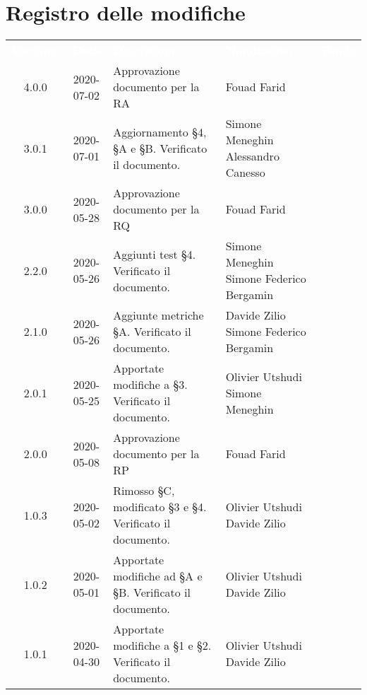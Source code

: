 \section*{Registro delle modifiche}
{
	\centering
	\begin{longtable}{ c c  C{4cm}  C{3.5cm}  C{3.5cm} }
		\textcolor{white}{\textbf{Versione}} & \textcolor{white}{\textbf{Data}} & \textcolor{white}{\textbf{Descrizione}} & \textcolor{white}{\textbf{Nominativo}} & \textcolor{white}{\textbf{Ruolo}}\\	
		4.0.0 & 2020-07-02 & Approvazione documento per la RA & Fouad Farid &\RdP \\
		3.0.1 & 2020-07-01 & Aggiornamento \S 4, \S A e \S B. Verificato il documento. & Simone Meneghin \newline Alessandro Canesso & \prog \newline \ver{} \\
		3.0.0 & 2020-05-28 & Approvazione documento per la RQ & Fouad Farid &\RdP \\	
		2.2.0 & 2020-05-26 & Aggiunti test \S 4. Verificato il documento. & Simone Meneghin \newline Simone Federico Bergamin  & \prog \newline \ver{} \\
		2.1.0 & 2020-05-26 & Aggiunte metriche \S A. Verificato il documento. & Davide Zilio \newline Simone Federico Bergamin  & \prog \newline \ver{} \\
		2.0.1 & 2020-05-25 & Apportate modifiche a §3. Verificato il documento.& Olivier Utshudi \newline Simone Meneghin & \prog \newline \ver{} \\
		2.0.0 & 2020-05-08 & Approvazione documento per la RP & Fouad Farid &\RdP \\
		1.0.3 & 2020-05-02 & Rimosso §C, modificato \S 3 e \S 4. Verificato il documento. & Olivier Utshudi \newline Davide Zilio &\prog \newline \ver{}\\		
		1.0.2 & 2020-05-01 & Apportate modifiche ad §A e §B. Verificato il documento. & Olivier Utshudi \newline Davide Zilio &\prog \newline \ver{}\\
		1.0.1 & 2020-04-30 & Apportate modifiche a §1 e §2. Verificato il documento. & Olivier Utshudi \newline Davide Zilio &\prog \newline \ver{}\\

\end{longtable}}
